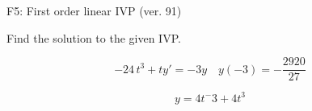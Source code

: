 \begin{exercise}
  \begin{exerciseTitle}F5: First order linear IVP (ver. 91)\end{exerciseTitle}
  \begin{exerciseStatement}
    
Find the solution to the given IVP.

    
\[-24 \, t^{3} +ty'= -3 y \hspace{1em} y( -3 ) = -\frac{2920}{27}\]

  \end{exerciseStatement}
  \begin{exerciseAnswer}
    
\[y= 4 t^ -3 +4 t^{3}\]

  \end{exerciseAnswer}
\end{exercise}